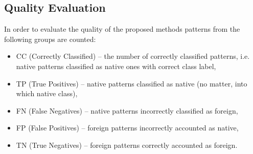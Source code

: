\documentclass{llncs}
\begin{document}
\vspace{-6pt}
\subsection{Quality Evaluation}
\label{subsec:QualityEvaluation}
\vspace{-3pt}

In order to evaluate the quality of the proposed methods patterns from the following groups are counted:
\begin{itemize}
\vspace{-6pt}
  \item CC  (Correctly Classified) -- the number of correctly classified patterns, i.e. native patterns classified as native ones with correct class label,
  \item TP  (True Positives) -- native patterns classified as native (no matter, into which native class),
  \item FN  (False Negatives) -- native patterns incorrectly classified as foreign,
  \item FP  (False Positives) -- foreign patterns incorrectly accounted as native,
  \item TN  (True Negatives) -- foreign patterns correctly accounted as foreign.
\end{itemize}
\end{document}
